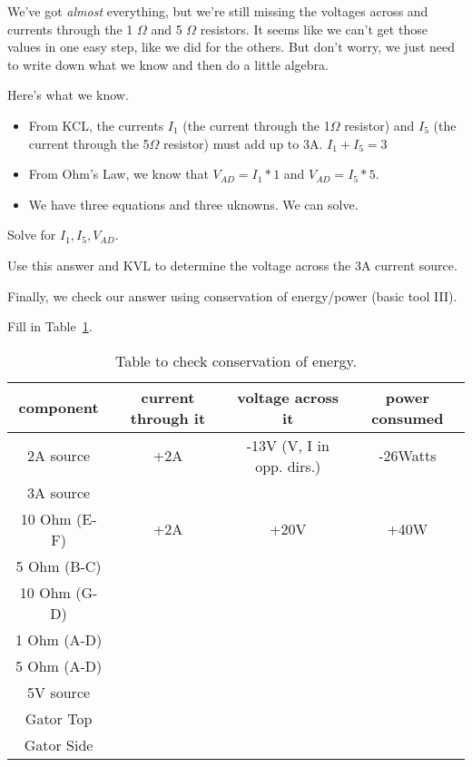 We've got \emph{almost} everything, but we're still missing the voltages across and currents through the 1 $\Omega$ and 5 $\Omega$ resistors. It seems like we can't get those values in one easy step, like we did for the others. But don't worry, we just need to write down what we know and then do a little algebra.
\par

Here's what we know.
\begin{itemize}
\item From KCL, the currents $I_1$ (the current through the 1$\Omega$ resistor) and $I_5$ (the current through the 5$\Omega$ resistor) must add up to 3A. $I_1+I_5=3$
\item From Ohm's Law, we know that $V_{AD}=I_1*1$ and $V_{AD}=I_5*5$. 
\item We have three equations and three uknowns. We can solve. 
\end{itemize} 

\begin{blevel}
Solve for $I_1,I_5,V_{AD}$. 
\end{blevel}

\begin{clevel}
Use this answer and KVL to determine the voltage across the 3A current source.
\end{clevel}

Finally, we check our answer using conservation of energy/power (basic tool III). 
\begin{clevel}
Fill in Table~\ref{F:3CKT3}.
\end{clevel}

\begin{table}[H]
\begin{center}
\begin{tabular}{|c|c|c|c|} \hline
component &	current through it	& voltage across it	& power consumed \\ \hline
2A source	&+2A			&-13V (V, I in opp. dirs.)	&-26Watts\\ \hline
3A source	&			&	&	\\ \hline
10 Ohm (E-F)	&+2A			&+20V	&+40W	\\ \hline
5 Ohm (B-C)	&			&	&	\\ \hline
10 Ohm (G-D)	&			&	&	\\ \hline
1 Ohm (A-D)	&			&	&	\\ \hline
5 Ohm (A-D)	&			&	&	\\ \hline
5V source	&			&	&	\\ \hline
Gator Top	&			&	&	\\ \hline
Gator Side	&			&	&	\\ \hline
\end{tabular}
\caption{Table to check conservation of energy.}
\label{F:3CKT3}
\end{center}
\end{table}

